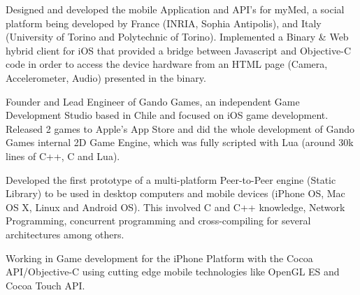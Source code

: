 \documentclass[10pt, a4paper]{moderncv}
\begin{document}
{
\begin{scriptsize}
Designed and developed the mobile Application and API's for myMed, a social platform being developed by France (INRIA, Sophia Antipolis), and Italy (University of Torino and Polytechnic of Torino).
Implemented a Binary \& Web hybrid client for iOS that provided a bridge between Javascript and Objective-C code in order to access the device hardware from an HTML page (Camera, Accelerometer,
Audio) presented in the binary.\\
\end{scriptsize}
}

{
\begin{scriptsize}
Founder and Lead Engineer of Gando Games, an independent Game Development Studio based in Chile and focused on iOS game development. Released 2 games to Apple's App Store and did the whole development of Gando Games internal 2D Game Engine, which was fully scripted with Lua (around 30k lines of C++, C and Lua).\\
\end{scriptsize}
}

{
\begin{scriptsize}
Developed the first prototype of a multi-platform Peer-to-Peer engine (Static Library) to be used in desktop computers and mobile devices (iPhone OS, Mac OS X, Linux and Android OS). This involved C and C++ knowledge, Network Programming, concurrent programming and cross-compiling for several architectures among others.\\
\end{scriptsize}
}

{
\begin{scriptsize}
Working in Game development for the iPhone Platform with the Cocoa API/Objective-C using cutting edge mobile technologies like OpenGL ES and Cocoa Touch API.\\
\end{scriptsize}
}
\end{document}

